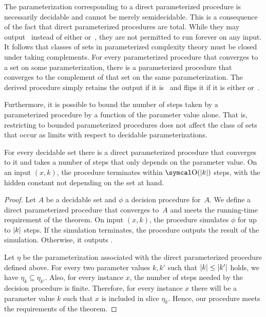 The parameterization corresponding to a direct parameterized procedure is necessarily decidable and cannot be merely semidecidable.
This is a consequence of the fact that direct parameterized procedures are total.
While they may output~ instead of either  or~, they are not permitted to run forever on any input.
It follows that classes of sets in parameterized complexity theory must be closed under taking complements.
For every parameterized procedure that converges to a set on some parameterization, there is a parameterized procedure that converges to the complement of that set on the same parameterization.
The derived procedure simply retains the output if it is~ and flips it if it is either  or~.

Furthermore, it is possible to bound the number of steps taken by a parameterized procedure by a function of the parameter value alone.
That is, restricting to bounded parameterized procedures does not affect the class of sets that occur as limits with respect to decidable parameterizations.

\begin{theorem}
\label{thm:slow_decidable}%
  For every decidable set there is a direct parameterized procedure that converges to it and takes a number of steps that only depends on the parameter value.
  On an input $(x, k)$, the procedure terminates within $\bigO(\length{k})$ steps, with the hidden constant not depending on the set at hand.
\end{theorem}
\begin{proof}
  Let $A$ be a decidable set and $\phi$ a decision procedure for~$A$.
  We define a direct parameterized procedure that converges to~$A$ and meets the running-time requirement of the theorem.
  On input $(x, k)$, the procedure simulates $\phi$ for up to ${\lvert k\rvert}$ steps.
  If the simulation terminates, the procedure outputs the result of the simulation.
  Otherwise, it outputs .

  Let $\eta$ be the parameterization associated with the direct parameterized procedure defined above.
  For every two parameter values $k, k'$ such that ${\lvert k\rvert} \le {\lvert k'\rvert}$ holds, we have $\eta_k \subseteq \eta_{k'}$.
  Also, for every instance $x$, the number of steps needed by the decision procedure is finite.
  Therefore, for every instance $x$ there will be a parameter value $k$ such that $x$ is included in slice $\eta_k$.
  Hence, our procedure meets the requirements of the theorem.
\end{proof}

